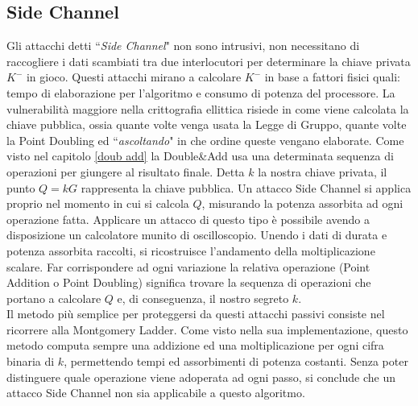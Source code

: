 \documentclass[a4paper,12pt]{tesiinfo}
\begin{document}
\subsection{Side Channel}
Gli attacchi detti ``\textit{Side Channel}" non sono intrusivi, non necessitano di raccogliere i dati scambiati tra due interlocutori per determinare la chiave privata $K^-$ in gioco. Questi attacchi mirano a calcolare $K^-$ in base a fattori fisici quali: tempo di elaborazione per l'algoritmo e consumo di potenza del processore. La vulnerabilit\`a maggiore nella crittografia ellittica risiede in come viene calcolata la chiave pubblica, ossia quante volte venga usata la Legge di Gruppo, quante volte la Point Doubling ed ``\textit{ascoltando}" in che ordine queste vengano elaborate. Come visto nel capitolo \ref{doub add} la Double\&Add usa una determinata sequenza di operazioni per giungere al risultato finale. Detta $k$ la nostra chiave privata, il punto $Q=kG$ rappresenta la chiave pubblica. Un attacco Side Channel si applica proprio nel momento in cui si calcola $Q$, misurando la potenza assorbita ad ogni operazione fatta. Applicare un attacco di questo tipo \`e possibile avendo a disposizione un calcolatore munito di oscilloscopio. Unendo i dati di durata e potenza assorbita raccolti, si ricostruisce l'andamento della moltiplicazione scalare. Far corrispondere ad ogni variazione la relativa operazione (Point Addition o Point Doubling) significa trovare la sequenza di operazioni che portano a calcolare $Q$ e, di conseguenza, il nostro segreto $k$.
\\
Il metodo pi\`u semplice per proteggersi da questi attacchi passivi consiste nel ricorrere alla Montgomery Ladder. Come visto nella sua implementazione, questo metodo computa sempre una addizione ed una moltiplicazione per ogni cifra binaria di $k$, permettendo tempi ed assorbimenti di potenza costanti. Senza poter distinguere quale operazione viene adoperata ad ogni passo, si conclude che un attacco Side Channel non sia applicabile a questo algoritmo.
%
%
%
%
%
%
%
%
%
%
%
%
%
%
%
%
\end{document}
